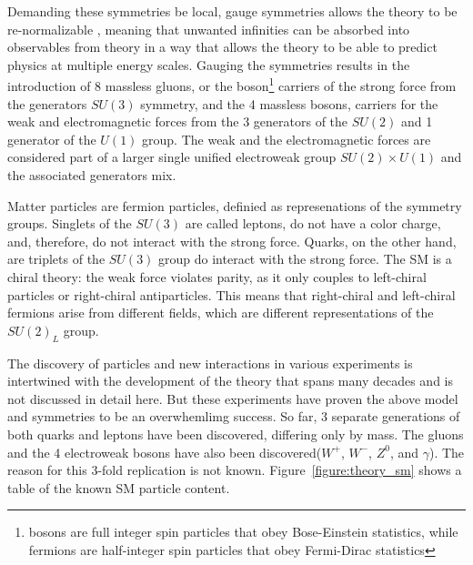 Demanding these symmetries be local, gauge symmetries allows the theory to be
re-normalizable \cite{1972.tHooft-Veltman.regularization_and_renormalization}, meaning that unwanted infinities can be absorbed into
observables from theory in a way that allows the theory to be able to predict
physics at multiple energy scales.
Gauging the symmetries results in the introduction of 8 massless gluons, or the
boson\footnote{bosons are full integer spin particles that obey Bose-Einstein statistics, while fermions are half-integer spin particles that obey Fermi-Dirac statistics} carriers of the strong force \cite{1973.Gross-Wilczek.Asymptotic_freedom_0} from the generators
$SU(3)$ symmetry, and the 4 massless bosons, carriers for the weak
and electromagnetic forces from the 3 generators of the $SU(2)$ and 1
generator of the $U(1)$ group. The weak and the electromagnetic forces are considered part of a larger single 
unified electroweak group $SU(2) \times U(1)$ and the associated generators mix. 

Matter particles are fermion particles, definied as represenations of the symmetry groups. Singlets of the $SU(3)$ 
are called leptons, do not have a color charge, and, therefore, do not interact with the strong force. Quarks,
on the other hand, are triplets of the $SU(3)$ group do interact with the strong force. The SM is a chiral theory:
the weak force violates parity, as it only couples to left-chiral particles or right-chiral antiparticles. 
This means that right-chiral and left-chiral fermions arise from different fields, which are
different representations of the $SU(2)_L$ group.
 
The discovery of particles and new interactions in various experiments
is intertwined with the development of the theory that spans many
decades and is not discussed in detail here. But these
experiments have proven the above model and symmetries to be an overwhemlimg success.
So far, 3 separate generations of both quarks and leptons have been discovered, differing only by mass. The gluons and the 4 electroweak bosons have also been discovered($W^+$, $W^-$, $Z^0$, and $\gamma$). The reason for this 3-fold replication is not known. Figure~\ref{figure:theory_sm} shows a table of the known SM particle content.  


